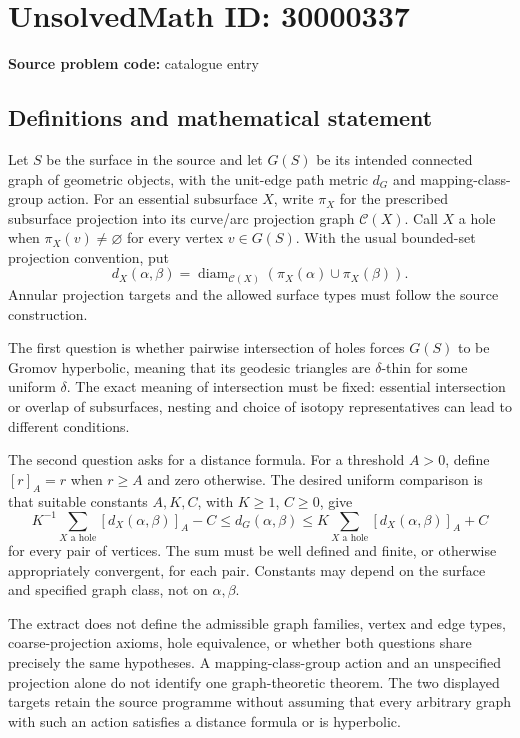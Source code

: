 \documentclass[11pt]{article}
\begin{document}
\section*{UnsolvedMath ID: 30000337}
\textbf{Source problem code:} catalogue entry
\subsection{Definitions and mathematical statement}
Let $S$ be the surface in the source and let $G(S)$ be its intended connected graph of geometric objects, with the unit-edge path metric $d_G$ and mapping-class-group action. For an essential subsurface $X$, write $\pi_X$ for the prescribed subsurface projection into its curve/arc projection graph $\mathcal C(X)$. Call $X$ a hole when $\pi_X(v)\ne\varnothing$ for every vertex $v\in G(S)$. With the usual bounded-set projection convention, put
\[
 d_X(\alpha,\beta)=\operatorname{diam}_{\mathcal C(X)}
                         (\pi_X(\alpha)\cup\pi_X(\beta)).
\]
Annular projection targets and the allowed surface types must follow the source construction.

The first question is whether pairwise intersection of holes forces $G(S)$ to be Gromov hyperbolic, meaning that its geodesic triangles are $\delta$-thin for some uniform $\delta$. The exact meaning of intersection must be fixed: essential intersection or overlap of subsurfaces, nesting and choice of isotopy representatives can lead to different conditions.

The second question asks for a distance formula. For a threshold $A>0$, define $[r]_A=r$ when $r\ge A$ and zero otherwise. The desired uniform comparison is that suitable constants $A,K,C$, with $K\ge1$, $C\ge0$, give
\[
 K^{-1}\sum_{X\text{ a hole}}[d_X(\alpha,\beta)]_A-C
 \le d_G(\alpha,\beta)
 \le K\sum_{X\text{ a hole}}[d_X(\alpha,\beta)]_A+C
\]
for every pair of vertices. The sum must be well defined and finite, or otherwise appropriately convergent, for each pair. Constants may depend on the surface and specified graph class, not on $\alpha,\beta$.

The extract does not define the admissible graph families, vertex and edge types, coarse-projection axioms, hole equivalence, or whether both questions share precisely the same hypotheses. A mapping-class-group action and an unspecified projection alone do not identify one graph-theoretic theorem. The two displayed targets retain the source programme without assuming that every arbitrary graph with such an action satisfies a distance formula or is hyperbolic.
\end{document}
